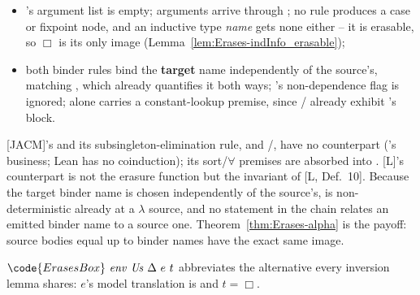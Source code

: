 \begin{definition}
\begin{itemize}
\item {}'s argument list is empty; arguments arrive through ; no rule
produces a case or fixpoint node, and an inductive type \emph{name} gets none either -- it is
erasable, so $\Box$ is its only image (Lemma~\ref{lem:Erases-indInfo_erasable});
\item both binder rules bind the \textbf{target} name independently of the source's, matching
\Lower{}, which already quantifies it both ways; 's non-dependence flag is ignored;
 alone carries a constant-lookup premise, since /
already exhibit 's block.
\end{itemize}
 [JACM]'s  and its subsingleton-elimination rule, and
/, have no counterpart (\Lower{}'s business; Lean has
no coinduction); its sort/$\forall$ premises are absorbed into . [L]'s counterpart
is not the erasure function but the invariant of [L, Def.\ 10].
 Because the target binder name is chosen independently of the source's,
\Erases{} is non-deterministic already at a $\lambda$ source, and no statement in the chain
relates an emitted binder name to a source one. Theorem~\ref{thm:Erases-alpha} is the payoff:
source bodies equal up to binder names have the exact same image.
\end{definition}

\begin{definition}
\label{def:ErasesBox}
\leanok
{}
 $\code{ErasesBox}\ \mathit{env}\ \mathit{Us}\ \Delta\ e\ t$ abbreviates the alternative every inversion lemma shares: $e$'s model translation is  and $t = \Box$.
\end{definition}

